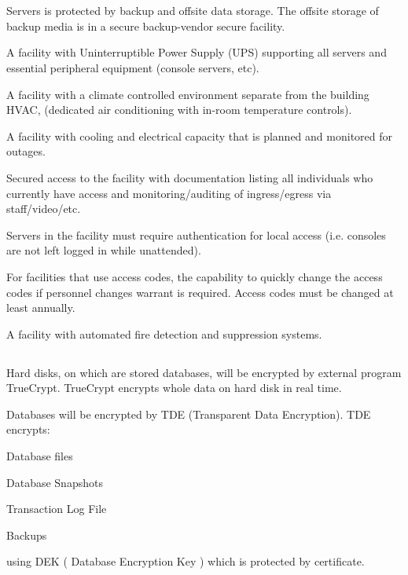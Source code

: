 \chapter{}
\section{}
\begin{packed_enum}
	\item Servers is protected by backup and offsite data storage. The offsite storage of backup media is in a secure backup-vendor secure facility.
	\item A facility with Uninterruptible Power Supply (UPS) supporting all servers and essential peripheral equipment (console servers, etc).
	\item A facility with a climate controlled environment separate from the building HVAC, (dedicated air conditioning with in-room temperature controls).
	\item A facility with cooling and electrical capacity that is planned and monitored for outages.
	\item Secured access to the facility with documentation listing all individuals who currently have access and monitoring/auditing of ingress/egress via staff/video/etc.
	\item Servers in the facility must require authentication for local access (i.e. consoles are not left logged in while unattended).
	\item For facilities that use access codes, the capability to quickly change the access codes if personnel changes warrant is required.  Access codes must be changed at least annually.
	\item A facility with automated fire detection and suppression systems.
\end{packed_enum}



\section{}

\begin{packed_enum}
	\item Hard disks, on which are stored databases, will be encrypted by external program TrueCrypt. TrueCrypt encrypts whole data on hard disk in real time. 
	\item Databases will be encrypted by TDE (Transparent Data Encryption). TDE encrypts:
        \begin{packed_enum}
			\item Database files
			\item Database Snapshots
			\item Transaction Log File
            \item Backups
		\end{packed_enum}
	using DEK ( Database Encryption Key ) which is protected by certificate.
\end{packed_enum}

